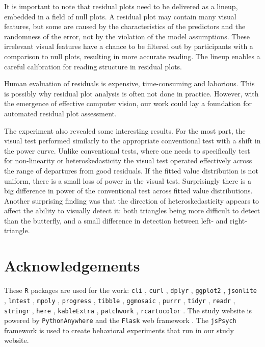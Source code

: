 \documentclass[]{interact}
\theoremstyle{plain}%
\theoremstyle{definition}
\theoremstyle{remark}
\begin{document}
It is important to note that residual plots need to be delivered as a
lineup, embedded in a field of null plots. A residual plot may contain
many visual features, but some are caused by the characteristics of the
predictors and the randomness of the error, not by the violation of the
model assumptions. These irrelevant visual features have a chance to be
filtered out by participants with a comparison to null plots, resulting
in more accurate reading. The lineup enables a careful calibration for
reading structure in residual plots.

Human evaluation of residuals is expensive, time-consuming and
laborious. This is possibly why residual plot analysis is often not done
in practice. However, with the emergence of effective computer vision,
our work could lay a foundation for automated residual plot assessment.

The experiment also revealed some interesting results. For the most
part, the visual test performed similarly to the appropriate
conventional test with a shift in the power curve. Unlike conventional
tests, where one needs to specifically test for non-linearity or
heteroskedasticity the visual test operated effectively across the range
of departures from good residuals. If the fitted value distribution is
not uniform, there is a small loss of power in the visual test.
Surprisingly there is a big difference in power of the conventional test
across fitted value distributions. Another surprising finding was that
the direction of heteroskedasticity appears to affect the ability to
visually detect it: both triangles being more difficult to detect than
the butterfly, and a small difference in detection between left- and
right-triangle.

\hypertarget{acknowledgements}{%
\section*{Acknowledgements}\label{acknowledgements}}

These \texttt{R} packages are used for the work: \texttt{cli}
\citep{cli}, \texttt{curl} \citep{curl}, \texttt{dplyr} \citep{dplyr},
\texttt{ggplot2} \citep{ggplot2}, \texttt{jsonlite} \citep{jsonlite},
\texttt{lmtest} \citep{lmtest}, \texttt{mpoly} \citep{mpoly},
\texttt{progress} \citep{progress}, \texttt{tibble} \citep{tibble},
\texttt{ggmosaic} \citep{ggmosaic}, \texttt{purrr} \citep{purrr},
\texttt{tidyr} \citep{tidyr}, \texttt{readr} \citep{readr},
\texttt{stringr} \citep{stringr}, \texttt{here} \citep{here},
\texttt{kableExtra} \citep{kableextra}, \texttt{patchwork}
\citep{patchwork}, \texttt{rcartocolor} \citep{rcartocolor}. The study
website is powered by \texttt{PythonAnywhere} \citep{pythonanywhere} and
the \texttt{Flask} web framework \citep{flask}. The \texttt{jsPsych}
framework \citep{jspsych} is used to create behavioral experiments that
run in our study website.
\end{document}
